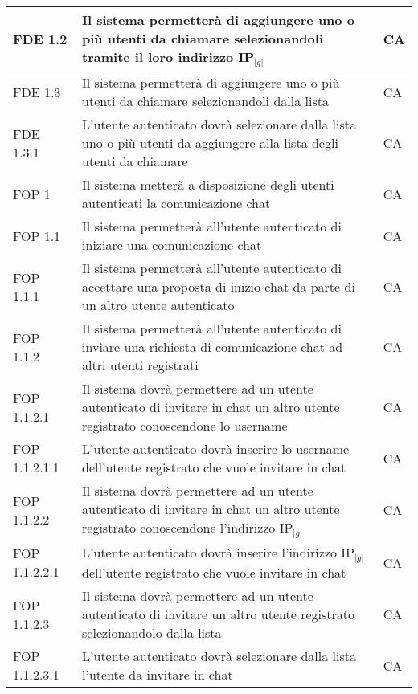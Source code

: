 \begin{longtable}{p{} p{} p{} }
\midrule
FDE 1.2 & Il sistema permetterà di aggiungere uno o più utenti da chiamare selezionandoli tramite il loro indirizzo IP$_{|g|}$ & CA\\

\midrule
FDE 1.3 & Il sistema permetterà di aggiungere uno o più utenti da chiamare selezionandoli dalla lista & CA\\
\midrule
FDE 1.3.1 & L'utente autenticato dovrà selezionare dalla lista uno o più utenti da aggiungere alla lista degli utenti da chiamare & CA\\

\midrule
FOP 1 & Il sistema metterà a disposizione degli utenti autenticati la comunicazione chat & CA\\

\midrule
FOP 1.1 & Il sistema permetterà all'utente autenticato di iniziare una comunicazione chat & CA\\

\midrule
FOP 1.1.1 & Il sistema permetterà all'utente autenticato di accettare una proposta di inizio chat da parte di un altro utente autenticato & CA\\

\midrule
FOP 1.1.2 & Il sistema permetterà all'utente autenticato di inviare una richiesta di comunicazione chat ad altri utenti registrati & CA\\

\midrule
FOP 1.1.2.1 & Il sistema dovrà permettere ad un utente autenticato di invitare in chat un altro utente registrato conoscendone lo username & CA\\
\midrule
FOP 1.1.2.1.1 & L'utente autenticato dovrà inserire lo username dell'utente registrato che vuole invitare in chat & CA\\

\midrule
FOP 1.1.2.2 & Il sistema dovrà permettere ad un utente autenticato di invitare in chat un altro utente registrato conoscendone l'indirizzo IP$_{|g|}$ & CA\\
\midrule
FOP 1.1.2.2.1 & L'utente autenticato dovrà inserire l'indirizzo IP$_{|g|}$ dell'utente registrato che vuole invitare in chat & CA\\

\midrule
FOP 1.1.2.3 & Il sistema dovrà permettere ad un utente autenticato di invitare un altro utente registrato selezionandolo dalla lista & CA\\
\midrule
FOP 1.1.2.3.1 & L'utente autenticato dovrà selezionare dalla lista l'utente da invitare in chat & CA\\


\end{longtable}
